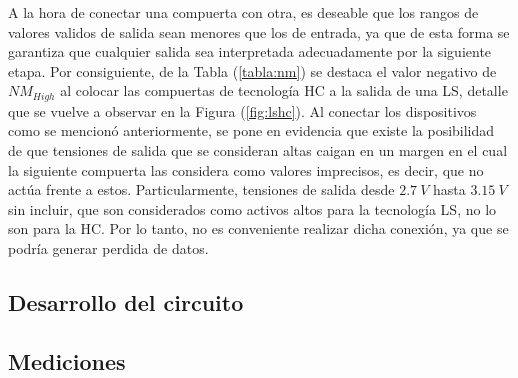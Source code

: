 A la hora de conectar una compuerta con otra, es deseable que los rangos de valores validos de salida sean menores que los de entrada, ya que de esta forma se garantiza que cualquier salida sea interpretada adecuadamente por la siguiente etapa. Por consiguiente, de la Tabla (\ref{tabla:nm}) se destaca el valor negativo de $NM_{High}$ al colocar las compuertas de tecnología HC a la salida de una LS, detalle que se vuelve a observar en la Figura (\ref{fig:lshc}). Al conectar los dispositivos como se mencionó anteriormente, se pone en evidencia que existe la posibilidad de que tensiones de salida que se consideran altas caigan en un margen en el cual la siguiente compuerta las considera como valores imprecisos, es decir, que no actúa frente a estos. Particularmente, tensiones de salida desde $2.7 \ V$ hasta $3.15 \ V$ sin incluir, que son considerados como activos altos para la tecnología LS, no lo son para la HC. Por lo tanto, no es conveniente realizar dicha conexión, ya que se podría generar perdida de datos.

\subsection{Desarrollo del circuito}

\subsection{Mediciones}

